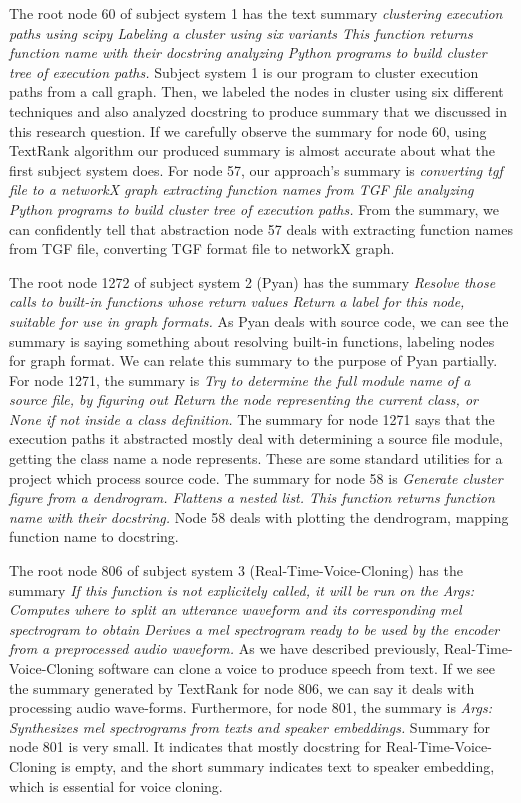  The root node 60 of subject system 1 has the text summary \textit{clustering execution paths using scipy Labeling a cluster using six variants  This function returns function name with their docstring  analyzing Python programs to build cluster tree of execution paths.} Subject system 1 is our program to cluster execution paths from a call graph. Then, we labeled the nodes in cluster using six different techniques and also analyzed docstring to produce summary that we discussed in this research question. If we carefully observe the summary for node 60, using TextRank algorithm our produced summary is almost accurate about what the first subject system does. For node 57, our approach's summary is \textit{converting tgf file to a networkX graph extracting function names from TGF file analyzing Python programs to build cluster tree of execution paths.} From the summary, we can confidently tell that abstraction node 57 deals with extracting function names from TGF file, converting TGF format file to networkX graph.
 
 
The root node 1272 of subject system 2 (Pyan) has the summary \textit{Resolve those calls to built-in functions whose return values Return a label for this node, suitable for use in graph formats.} As Pyan deals with source code, we can see the summary is saying something about resolving built-in functions, labeling nodes for graph format. We can relate this summary to the purpose of Pyan partially. For node 1271, the summary is \textit{Try to determine the full module name of a source file, by figuring out       Return the node representing the current class, or None if not inside a class definition.}
The summary for node 1271 says that the execution paths it abstracted mostly deal with determining a source file module, getting the class name a node represents. These are some standard utilities for a project which process source code. The summary for node 58 is \textit{Generate cluster figure from a dendrogram. Flattens a nested list. This function returns function name with their docstring.} Node 58 deals with plotting the dendrogram, mapping function name to docstring.

The root node 806 of subject system 3 (Real-Time-Voice-Cloning) has the summary \textit{If this function is not explicitely called, it will be run on the Args:                  Computes where to split an utterance waveform and its corresponding mel spectrogram to obtain   Derives a mel spectrogram ready to be used by the encoder from a preprocessed audio waveform.} As we have described previously, Real-Time-Voice-Cloning software can clone a voice to produce speech from text. If we see the summary generated by TextRank for node 806, we can say it deals with processing audio wave-forms. Furthermore, for node 801, the summary is \textit{Args:   Synthesizes mel spectrograms from texts and speaker embeddings.} Summary for node 801 is very small. It indicates that mostly docstring for Real-Time-Voice-Cloning is empty, and the short summary indicates text to speaker embedding, which is essential for voice cloning.

